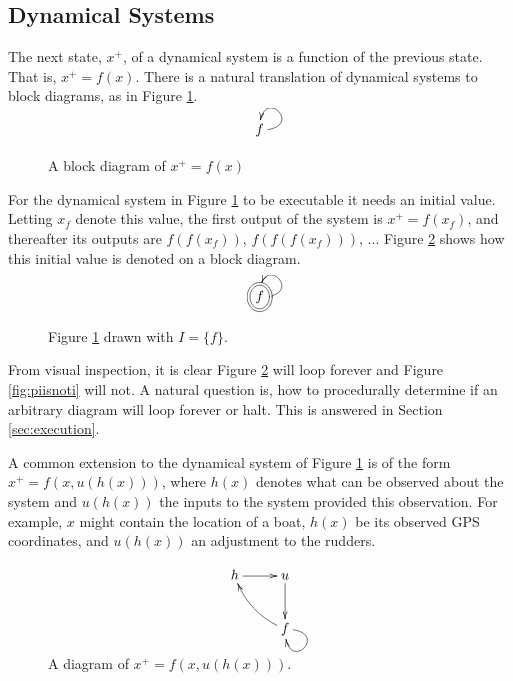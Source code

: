 \documentclass[twocolumn]{article}
\begin{document}
\subsection{Dynamical Systems}\label{sec:dynamical}

The next state, $x^+$, of a dynamical system is a function of the previous state. That is, $x^+=f(x)$. There is a natural translation of dynamical systems to block diagrams, as in Figure \ref{fig:simpledynamical}.

\begin{figure}[h]
\[
    \xymatrix {
        f \ar@(r, u)[]
    }
\]
    \caption{A block diagram of $x^+=f(x)$}
    \label{fig:simpledynamical}
\end{figure}

For the dynamical system in Figure \ref{fig:simpledynamical} to be executable it needs an initial value. Letting $x_f$ denote this value, the first output of the system is $x^+=f(x_f)$, and thereafter its outputs are $f(f(x_f))$, $f(f(f(x_f)))$, ... Figure \ref{fig:simpleinitialization} shows how this initial value is denoted on a block diagram.

\begin{figure}[h]
\[
    \xymatrix {
        *++[o][F=]{f} \ar@(r, u)[]
    }
\]
    \caption{Figure \ref{fig:simpledynamical} drawn with $I=\{f\}$.}
    \label{fig:simpleinitialization}
\end{figure}

From visual inspection, it is clear Figure \ref{fig:simpleinitialization} will loop forever and Figure \ref{fig:piisnoti} will not. A natural question is, how to procedurally determine if an arbitrary diagram will loop forever or halt. This is answered in Section \ref{sec:execution}.

A common extension to the dynamical system of Figure \ref{fig:simpledynamical} is of the form $x^+=f(x,u(h(x)))$, where $h(x)$ denotes what can be observed about the system and $u(h(x))$ the inputs to the system provided this observation. For example, $x$ might contain the location of a boat, $h(x)$ be its observed GPS coordinates, and $u(h(x))$ an adjustment to the rudders.

\begin{figure}[h]
\[
    \xymatrix {
        h \ar[r] & u \ar[d] \\
        & f \ar@/^/[lu] \ar@(r, d)[]
    }
\]
    \caption{A diagram of $x^+=f(x,u(h(x)))$.}
    \label{fig:v2dynamical}
\end{figure}
\end{document}
